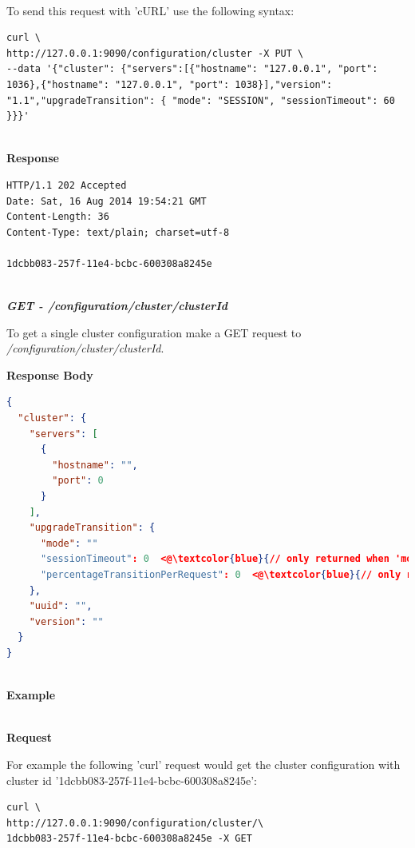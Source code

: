 \documentclass[a4paper,11pt,twoside]{report}
\begin{document}
\begin{appendices}
\noindent \\
To send this request with 'cURL' use the following syntax:\bigskip

\begin{lstlisting}[language=terminal]
curl \
http://127.0.0.1:9090/configuration/cluster -X PUT \
--data '{"cluster": {"servers":[{"hostname": "127.0.0.1", "port": 1036},{"hostname": "127.0.0.1", "port": 1038}],"version": "1.1","upgradeTransition": { "mode": "SESSION", "sessionTimeout": 60 }}}'
\end{lstlisting}

\noindent \\
\textbf{Response}

\begin{lstlisting}[language=terminal]
HTTP/1.1 202 Accepted
Date: Sat, 16 Aug 2014 19:54:21 GMT
Content-Length: 36
Content-Type: text/plain; charset=utf-8
 
1dcbb083-257f-11e4-bcbc-600308a8245e
\end{lstlisting}

\noindent \\
\textit{\textbf{GET - /configuration/cluster/{clusterId}}}\bigskip

\noindent 
To get a single cluster configuration make a GET request to \textit{/configuration/cluster/{clusterId}}.\bigskip 

\noindent 
\textbf{Response Body}

\begin{lstlisting}[language=json]
{
  "cluster": {
    "servers": [
      {
        "hostname": "",
        "port": 0
      }
    ],
    "upgradeTransition": {
      "mode": ""
      "sessionTimeout": 0  <@\textcolor{blue}{// only returned when 'mode' is "SESSION" }@>
      "percentageTransitionPerRequest": 0  <@\textcolor{blue}{// only returned when 'mode' is "GRADUAL"}@>
    },
    "uuid": "",
    "version": ""
  }
} 
\end{lstlisting}

\noindent \\
\textbf{Example}

\noindent \\
\textbf{Request}

\noindent 
For example the following 'curl' request would get the cluster configuration with cluster id '1dcbb083-257f-11e4-bcbc-600308a8245e':\bigskip

\begin{lstlisting}[language=terminal]
curl \
http://127.0.0.1:9090/configuration/cluster/\
1dcbb083-257f-11e4-bcbc-600308a8245e -X GET
\end{lstlisting}


\end{appendices}
\end{document}
